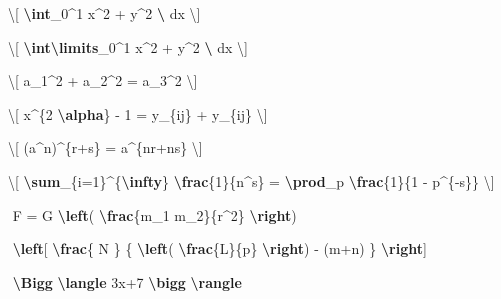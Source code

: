 \documentclass[12pt,a4paper,]{book}
\newenvironment{Shaded}{\begin{snugshade}}{\end{snugshade}}
\newcommand{\SpecialCharTok}[1]{\textcolor[rgb]{0.81,0.36,0.00}{\textbf{#1}}}
\newcommand{\SpecialStringTok}[1]{\textcolor[rgb]{0.31,0.60,0.02}{#1}}
\numberwithin{dummy}{section}
\theoremstyle{ocrenumbox}
\theoremstyle{blacknumex}
\theoremstyle{blacknumbox}
\theoremstyle{ocrenum}
\theoremstyle{ocrenum}
\begin{document}
\begin{Shaded}
\begin{Highlighting}[]
\SpecialStringTok{\textbackslash{}[ }\SpecialCharTok{\textbackslash{}int}\SpecialStringTok{\_0\^{}1 x\^{}2 + y\^{}2 }\SpecialCharTok{\textbackslash{} }\SpecialStringTok{dx \textbackslash{}]}

\SpecialStringTok{\textbackslash{}[ }\SpecialCharTok{\textbackslash{}int\textbackslash{}limits}\SpecialStringTok{\_0\^{}1 x\^{}2 + y\^{}2 }\SpecialCharTok{\textbackslash{} }\SpecialStringTok{dx \textbackslash{}]}

\SpecialStringTok{\textbackslash{}[ a\_1\^{}2 + a\_2\^{}2 = a\_3\^{}2 \textbackslash{}]}

\SpecialStringTok{\textbackslash{}[ x\^{}\{2 }\SpecialCharTok{\textbackslash{}alpha}\SpecialStringTok{\} {-} 1 = y\_\{ij\} + y\_\{ij\}  \textbackslash{}]}

\SpecialStringTok{\textbackslash{}[ (a\^{}n)\^{}\{r+s\} = a\^{}\{nr+ns\}  \textbackslash{}]}

\SpecialStringTok{\textbackslash{}[ }\SpecialCharTok{\textbackslash{}sum}\SpecialStringTok{\_\{i=1\}\^{}\{}\SpecialCharTok{\textbackslash{}infty}\SpecialStringTok{\} }\SpecialCharTok{\textbackslash{}frac}\SpecialStringTok{\{1\}\{n\^{}s\} }
\SpecialStringTok{= }\SpecialCharTok{\textbackslash{}prod}\SpecialStringTok{\_p }\SpecialCharTok{\textbackslash{}frac}\SpecialStringTok{\{1\}\{1 {-} p\^{}\{{-}s\}\} \textbackslash{}]}

\SpecialStringTok{$$ }
\SpecialStringTok{F = G }\SpecialCharTok{\textbackslash{}left}\SpecialStringTok{( }\SpecialCharTok{\textbackslash{}frac}\SpecialStringTok{\{m\_1 m\_2\}\{r\^{}2\} }\SpecialCharTok{\textbackslash{}right}\SpecialStringTok{)}
\SpecialStringTok{$$}

\SpecialStringTok{$$ }
\SpecialStringTok{ }\SpecialCharTok{\textbackslash{}left}\SpecialStringTok{[  }\SpecialCharTok{\textbackslash{}frac}\SpecialStringTok{\{ N \} \{ }\SpecialCharTok{\textbackslash{}left}\SpecialStringTok{( }\SpecialCharTok{\textbackslash{}frac}\SpecialStringTok{\{L\}\{p\} }\SpecialCharTok{\textbackslash{}right}\SpecialStringTok{)  {-} (m+n) \}  }\SpecialCharTok{\textbackslash{}right}\SpecialStringTok{]}
\SpecialStringTok{$$}

\SpecialStringTok{$$}
\SpecialStringTok{ }\SpecialCharTok{\textbackslash{}Bigg}\SpecialStringTok{ }\SpecialCharTok{\textbackslash{}langle}\SpecialStringTok{ 3x+7 }\SpecialCharTok{\textbackslash{}bigg}\SpecialStringTok{ }\SpecialCharTok{\textbackslash{}rangle}
\SpecialStringTok{$$}
\end{Highlighting}
\end{Shaded}
\end{document}
